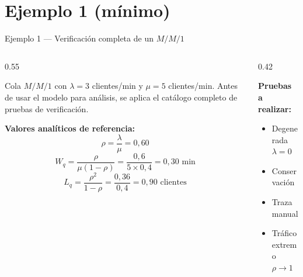 \documentclass[aspectratio=1610, 10pt]{beamer}
\begin{document}
\section{Ejemplo 1 (mínimo)}

\begin{frame}{Ejemplo 1 — Verificación completa de un $M/M/1$}
  \begin{columns}[T]
    \begin{column}{0.55\textwidth}
      \begin{ejemplobox}[Sistema]
        \footnotesize
        Cola $M/M/1$ con $\lambda=3$ clientes/min y $\mu=5$ clientes/min.
        Antes de usar el modelo para análisis, se aplica el catálogo
        completo de pruebas de verificación.
      \end{ejemplobox}

      \vspace{4pt}
      \textbf{Valores analíticos de referencia:}
      \[
        \rho=\frac{\lambda}{\mu}=0{,}60
      \]
      \[
        W_q=\frac{\rho}{\mu(1-\rho)}=\frac{0{,}6}{5\times 0{,}4}=0{,}30 \text{ min}
      \]
      \[
        L_q=\frac{\rho^2}{1-\rho}=\frac{0{,}36}{0{,}4}=0{,}90 \text{ clientes}
      \]
    \end{column}
    \begin{column}{0.42\textwidth}

      \vspace{4pt}
      \textbf{Pruebas a realizar:}
      \begin{itemize}\footnotesize\itemsep1pt
        \item Degenerada $\lambda=0$
        \item Conservación
        \item Traza manual
        \item Tráfico extremo $\rho\to 1$
      \end{itemize}
    \end{column}
  \end{columns}
\end{frame}
\end{document}
